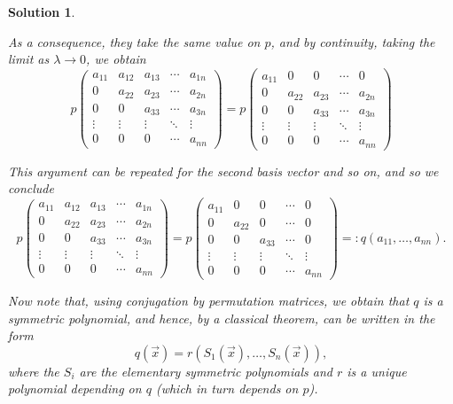 \documentclass{article}
\theoremstyle{nonumberplain}
\newtheorem{sol}{Solution}
\begin{document}
\begin{sol}
\begin{enumerate}
As a consequence, they take the same value on $p$, and by continuity, taking the limit as $\lambda \to 0$, we obtain
\begin{equation}
p\begin{pmatrix}
a_{11} & a_{12} & a_{13} & \cdots & a_{1n} \\
0 & a_{22} & a_{23} & \cdots & a_{2n} \\
0 & 0 & a_{33} & \cdots & a_{3n} \\
\vdots & \vdots & \vdots & \ddots & \vdots \\
0 & 0 & 0 & \cdots & a_{nn}
\end{pmatrix}
=
p\begin{pmatrix}
a_{11} & 0 & 0 & \cdots & 0 \\
0 & a_{22} & a_{23} & \cdots & a_{2n} \\
0 & 0 & a_{33} & \cdots & a_{3n} \\
\vdots & \vdots & \vdots & \ddots & \vdots \\
0 & 0 & 0 & \cdots & a_{nn}
\end{pmatrix}
\end{equation}

This argument can be repeated for the second basis vector and so on, and so we conclude
\begin{equation}
p\begin{pmatrix}
a_{11} & a_{12} & a_{13} & \cdots & a_{1n} \\
0 & a_{22} & a_{23} & \cdots & a_{2n} \\
0 & 0 & a_{33} & \cdots & a_{3n} \\
\vdots & \vdots & \vdots & \ddots & \vdots \\
0 & 0 & 0 & \cdots & a_{nn}
\end{pmatrix}
=
p\begin{pmatrix}
a_{11} & 0 & 0 & \cdots & 0 \\
0 & a_{22} & 0 & \cdots & 0 \\
0 & 0 & a_{33} & \cdots & 0 \\
\vdots & \vdots & \vdots & \ddots & \vdots \\
0 & 0 & 0 & \cdots & a_{nn}
\end{pmatrix}
=: q(a_{11}, \dots, a_{nn}).
\end{equation}

Now note that, using conjugation by permutation matrices, we obtain that $q$ is a symmetric polynomial, and hence, by a classical theorem, can be written in the form
\begin{equation}
q(\vec x) = r(S_1(\vec x), \dots, S_n(\vec x)),
\end{equation}
where the $S_i$ are the elementary symmetric polynomials and $r$ is a unique polynomial depending on $q$ (which in turn depends on $p$).


\end{enumerate}
\end{sol}
\end{document}
